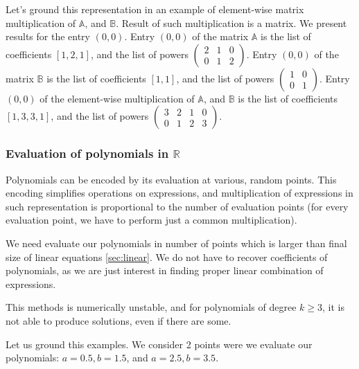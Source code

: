 Let's ground this representation in an example of element-wise matrix multiplication of $\mathbb{A}$, and $\mathbb{B}$.
Result of such multiplication is a matrix. We present results for the entry $(0, 0)$.
Entry $(0, 0)$ of the matrix $\mathbb{A}$ is the list of coefficients $[1, 2, 1]$, and the list
of powers $\begin{pmatrix} 2 & 1 & 0\\ 0 & 1 & 2 \end{pmatrix}$. Entry $(0, 0)$ of the matrix $\mathbb{B}$ is
the list of coefficients $[1, 1]$, and the list of powers 
$\begin{pmatrix} 1 & 0 \\ 0 & 1 \end{pmatrix}$. Entry $(0, 0)$ of the element-wise multiplication of $\mathbb{A}$, and $\mathbb{B}$
is the list of coefficients $[1, 3, 3, 1]$, and
the list of powers $\begin{pmatrix} 3 & 2 & 1 & 0 \\ 0 & 1 & 2 & 3 \end{pmatrix}$. 


\subsubsection{Evaluation of polynomials in $\mathbb{R}$}
Polynomials can be encoded by its evaluation at various, random points.
This encoding simplifies operations on expressions, and multiplication of expressions
in such representation is proportional to the number of evaluation points (for every evaluation
point, we have to perform just a common multiplication).

We need evaluate our polynomials in number of points which is larger 
than final size of linear equations \ref{sec:linear}. We do not have to recover coefficients of polynomials,
as we are just interest in finding proper linear combination of expressions.

This methods is numerically unstable, and for polynomials of degree $k \geq 3$, 
it is not able to produce solutions, even if there are some.

Let us ground this examples. We consider 2 points were we evaluate our polynomials:
$a = 0.5, b = 1.5$, and $a = 2.5, b = 3.5$.

